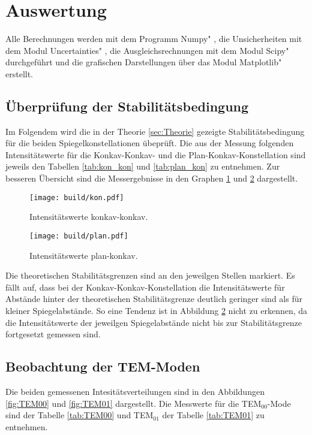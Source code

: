 \section{Auswertung}
\label{sec:Auswertung}
Alle Berechnungen werden mit dem Programm \glqq Numpy" \cite{numpy}, die Unsicherheiten mit dem Modul \glqq Uncertainties" \cite{uncertainties}, die Ausgleichsrechnungen mit dem Modul \glqq Scipy" \cite{scipy} durchgeführt und die grafischen Darstellungen über das Modul \glqq Matplotlib" \cite{matplotlib} erstellt.

\subsection{Überprüfung der Stabilitätsbedingung}

Im Folgendem wird die in der Theorie \ref{sec:Theorie} gezeigte Stabilitätsbedingung für die beiden Spiegelkonstellationen übeprüft.
Die aus der Messung folgenden Intensitätswerte für die Konkav-Konkav- und die Plan-Konkav-Konstellation sind jeweils den Tabellen \ref{tab:kon_kon} und \ref{tab:plan_kon} zu entnehmen. 
Zur besseren Übersicht sind die Messergebnisse in den Graphen \ref{fig:kon} und \ref{fig:plan} dargestellt. 

\begin{figure}
    \centering
    \texttt{[image: build/kon.pdf]}
    \caption{Intensitätswerte konkav-konkav.}
    \label{fig:kon}
\end{figure}

\begin{figure}
    \centering
    \texttt{[image: build/plan.pdf]}
    \caption{Intensitätswerte plan-konkav.}
    \label{fig:plan}
\end{figure}

Die theoretischen Stabilitätsgrenzen sind an den jeweilgen Stellen markiert. 
Es fällt auf, dass bei der Konkav-Konkav-Konstellation die Intensitätswerte für Abstände hinter der theoretischen Stabilitätsgrenze deutlich geringer sind als für kleiner Spiegelabstände. 
So eine Tendenz ist in Abbildung \ref{fig:plan} nicht zu erkennen, da die Intensitätswerte der jeweilgen Spiegelabstände nicht bis zur Stabilitätsgrenze fortgesetzt gemessen sind. 


\subsection{Beobachtung der TEM-Moden}
 
Die beiden gemessenen Intesitätsverteilungen sind in den Abbildungen \ref{fig:TEM00} und \ref{fig:TEM01} dargestellt. Die Messwerte für die TEM$_{00}$-Mode sind der Tabelle \ref{tab:TEM00} und TEM$_{01}$ der Tabelle \ref{tab:TEM01} zu entnehmen.


